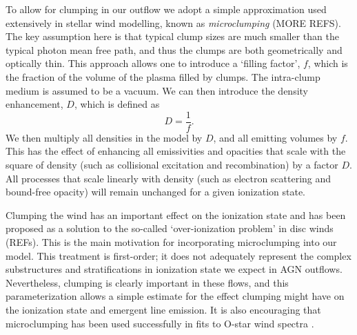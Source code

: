 \documentclass[preprint, a4paper, 11pt]{aastex}
\begin{document}

To allow for clumping in our outflow we adopt a simple approximation
used extensively in stellar wind modelling, known as 
{\em microclumping} \citep{hamann1998}(MORE REFS). The key assumption here is that 
typical clump sizes are much smaller than the typical photon mean free path, 
and thus the clumps are 
both geometrically and optically thin. This approach 
allows one to introduce a `filling factor', $f$, which is the 
fraction of the volume of the plasma filled by clumps. The intra-clump
medium is assumed to be a vacuum. We can then introduce the 
density enhancement, $D$, which is defined as 
\begin{equation}
D = \frac{1}{f}.
\end{equation}
We then multiply all densities in the model by $D$, and all emitting volumes
by $f$. This has the effect of enhancing all emissivities and opacities
that scale with the square of density (such as collisional excitation and recombination) 
by a factor $D$. All processes that scale linearly with density 
(such as electron scattering and bound-free opacity)
will remain unchanged for a given ionization state. 

Clumping the wind has an important effect on the ionization state and has
been proposed as a solution to the so-called `over-ionization problem' in 
disc winds (REFs). This is the main motivation for incorporating microclumping
into our model. This treatment is first-order; it does not adequately
represent the complex substructures and stratifications in ionization
state we expect in AGN outflows. Nevertheless, clumping is clearly
important in these flows, and this parameterization allows a simple estimate
for the effect clumping might have on the ionization state and emergent 
line emission. It is also encouraging that microclumping has been used 
successfully in fits to O-star wind spectra \citep{hillier1991eswingsmodel}.
\end{document}
